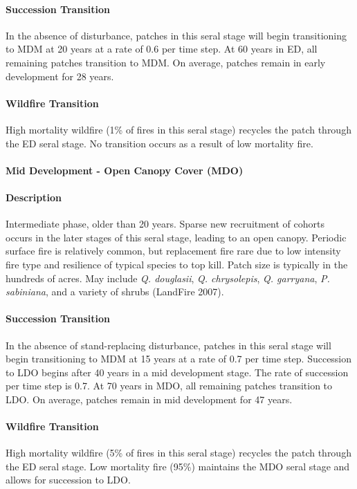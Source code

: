 \paragraph*{Succession Transition} In the absence of disturbance, patches in this seral stage will begin transitioning to MDM at 20 years at a rate of 0.6 per time step. At 60 years in ED, all remaining patches transition to MDM. On average, patches remain in early development for 28 years.

\paragraph*{Wildfire Transition} High mortality wildfire (1\% of fires in this seral stage) recycles the patch through the ED seral stage. No transition occurs as a result of low mortality fire. 

\noindent\hrulefill


\paragraph*{Mid Development - Open Canopy Cover (MDO)}

\paragraph*{Description} Intermediate phase, older than 20 years. Sparse new recruitment of cohorts occurs in the later stages of this seral stage, leading to an open canopy. Periodic surface fire is relatively common, but replacement fire rare due to low intensity fire type and resilience of typical species to top kill. Patch size is typically in the hundreds of acres. May include \emph{Q. douglasii}, \emph{Q. chrysolepis}, \emph{Q. garryana}, \emph{P. sabiniana}, and a variety of shrubs (LandFire 2007).

\paragraph*{Succession Transition} In the absence of stand-replacing disturbance, patches in this seral stage will begin transitioning to MDM at 15 years at a rate of 0.7 per time step. Succession to LDO begins after 40 years in a mid development stage. The rate of succession per time step is 0.7. At 70 years in MDO, all remaining patches transition to LDO. On average, patches remain in mid development for 47 years.

\paragraph*{Wildfire Transition} High mortality wildfire (5\% of fires in this seral stage) recycles the patch through the ED seral stage. Low mortality fire (95\%) maintains the MDO seral stage and allows for succession to LDO.

